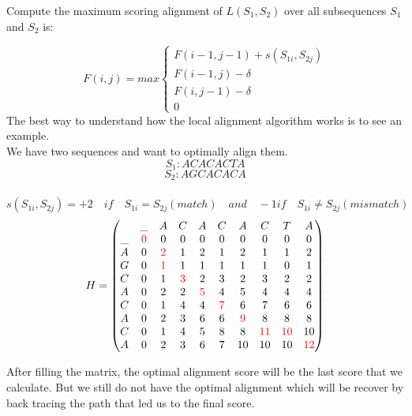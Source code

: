 \documentclass[11pt,a4paper]{report}
\begin{document}
Compute the maximum scoring alignment of $L(S_{1}, S_{2})$ over all subsequences $S_{1}$ and $S_{2}$ is:


\[ F(i,j)= max
\begin{cases}
   F(i-1,j-1) + s(S_{1i} , S_{2j})\\
   F(i-1 , j)- \delta\\
   F(i,j-1)- \delta\\
   0 \quad  
\end{cases}
\]
The best way to understand how the local alignment algorithm works is to see an example.\\

We have two sequences and want to optimally align them.
$$S_{1}:ACACACTA$$
$$S_{2}:AGCACACA$$\\
$s(S_{1i},S_{2j})= +2 \quad if \quad S_{1i} = S_{2j}(match) \quad and \quad-1 if \quad S_{1i}\neq S_{2j}(mismatch)$\\



\[
H = 
 \begin{pmatrix}
   & $\_$ & A & C & A & C & A & C & T & A \\
 $\_$ & \textcolor{red}{0} & 0 & 0 & 0 & 0 & 0 & 0 & 0 & 0 \\
 A & 0 & \textcolor{red}{2} & 1 & 2 & 1 & 2 & 1 & 1 & 2 \\
 G & 0 & \textcolor{red}{1} & 1 & 1 & 1 & 1 & 1 & 0 & 1 \\
 C & 0 & 1 & \textcolor{red}{3} & 2 & 3 & 2 & 3 & 2 & 2 \\
 A & 0 & 2 & 2 & \textcolor{red}{5} & 4 & 5 & 4 & 4 & 4 \\
 C & 0 & 1 & 4 & 4 & \textcolor{red}{7}  & 6 & 7 & 6 & 6 \\
 A & 0 & 2 & 3 & 6 & 6 & \textcolor{red}{9} & 8 & 8 & 8 \\
 C & 0 & 1 & 4 & 5 & 8 & 8 & \textcolor{red}{11} & \textcolor{red}{10} & 10 \\
 A & 0 & 2 & 3 & 6 & 7 & 10 & 10 & 10 & \textcolor{red}{12} \\
  
 \end{pmatrix}
\]

After filling the matrix, the optimal alignment score will be the last score that we calculate.
But we still do not have the optimal alignment which will be recover by back tracing the path that led us to the final score.
\end{document}
